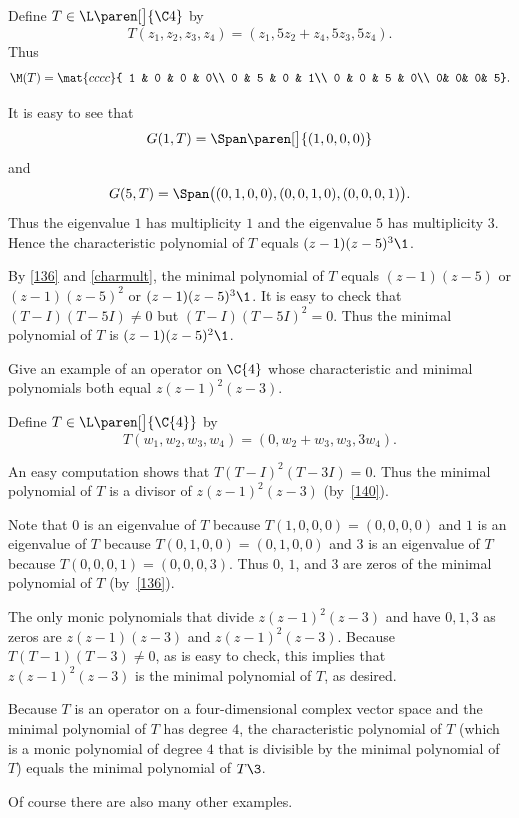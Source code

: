 \begin{Solution}
Define $T \in \L\paren[\big]{\C4}$ by
\[
T(z_1, z_2, z_3, z_4) = (z_1, 5z_2 + z_4, 5z_3, 5z_4).
\]
Thus
\[
\M(T) = \mat{cccc}{
1 & 0 & 0 & 0\\
0 & 5 & 0 & 1\\
0 & 0 & 5 & 0\\
0& 0& 0& 5}.
\]

It is easy to see that
\[
G(1, T) = \Span \paren[\big]{ (1, 0, 0, 0) }
\]
and
\[
G(5, T) = \Span \bigl( (0, 1, 0, 0), (0, 0, 1, 0), (0, 0, 0, 1) \bigr).
\]
Thus the eigenvalue $1$ has multiplicity $1$ and the eigenvalue $5$ has multiplicity $3$. Hence the characteristic polynomial of $T$ equals $(z-1)(z-5)^3\1$.

By \ref{136} and \ref{charmult}, the minimal polynomial of $T$ equals $(z-1)(z-5)$ or $(z-1)(z-5)^2$ or $(z-1)(z-5)^3\1$. It is easy to check that $(T - I)(T - 5I) \ne 0$ but $(T - I)(T - 5I)^2 = 0$. Thus the minimal polynomial of $T$ is $(z-1)(z-5)^2\1$.
\end{Solution}

\exercise
Give an example of an operator on $\C{4}$ whose characteristic and
minimal polynomials both equal $z (z - 1)^2 (z - 3)$.

\begin{Solution}
Define $T \in \L\paren[\big]{\C{4}}$ by
\[
T(w_1, w_2, w_3, w_4) = (0, w_2 + w_3, w_3, 3w_4).
\]

An easy computation shows that $T(T - I)^2(T - 3I) = 0$.  Thus the minimal
polynomial of $T$ is a divisor of $z (z - 1)^2 (z - 3)$ (by~\ref{140}).

Note that $0$ is an eigenvalue of $T$ because $T(1,0,0,0) = (0, 0, 0, 0)$ and $1$
is an eigenvalue of $T$ because $T(0,1,0,0) = (0,1,0,0)$ and $3$ is an eigenvalue
of $T$ because $T(0,0,0,1) = (0,0,0,3)$.  Thus $0$, $1$, and $3$ are zeros of
the minimal polynomial of $T$ (by~\ref{136}).

The only monic polynomials that divide $z (z - 1)^2 (z - 3)$ and have $0, 1, 3$
as zeros are $z (z - 1) (z - 3)$ and $z (z - 1)^2 (z - 3)$.  Because
$T(T-1)(T-3) \ne 0$, as is easy to check, this implies that $z (z - 1)^2 (z - 3)$
is the minimal polynomial of $T$, as desired.

Because $T$ is an operator on a four-dimensional complex vector space and the
minimal polynomial of $T$ has degree $4$, the characteristic polynomial of $T$
(which is a monic polynomial of degree $4$ that is divisible by the minimal
polynomial of $T$) equals the minimal polynomial of $T\3$.

Of course there are also many other examples.
\end{Solution}

